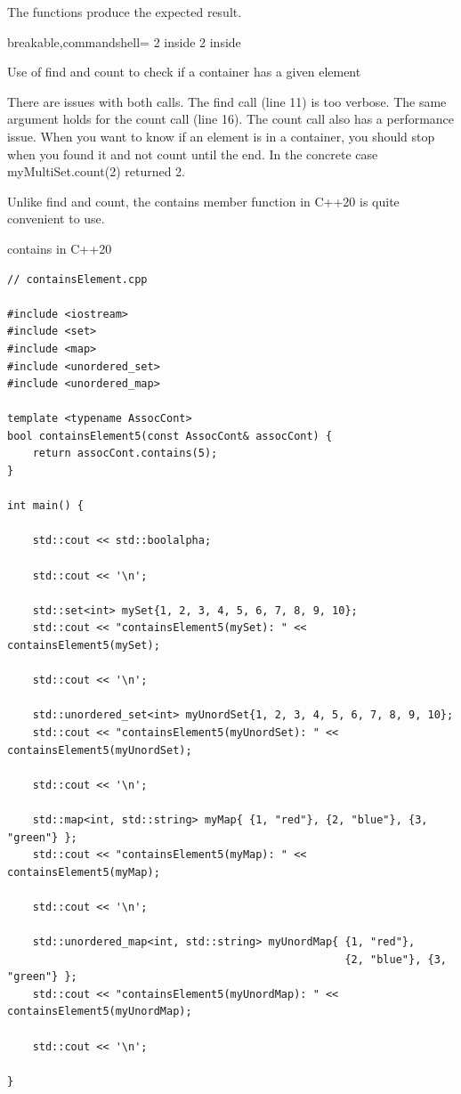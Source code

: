The functions produce the expected result.

\begin{tcblisting}{breakable,commandshell={}}
2 inside
2 inside
\end{tcblisting}

\begin{center}
Use of find and count to check if a container has a given element
\end{center}

There are issues with both calls. The find call (line 11) is too verbose. The same argument holds for the count call (line 16). The count call also has a performance issue. When you want to know if an element is in a container, you should stop when you found it and not count until the end. In the concrete case myMultiSet.count(2) returned 2.

Unlike find and count, the contains member function in C++20 is quite convenient to use.

\noindent
contains in C++20
\begin{lstlisting}[style=styleCXX]
// containsElement.cpp

#include <iostream>
#include <set>
#include <map>
#include <unordered_set>
#include <unordered_map>

template <typename AssocCont>
bool containsElement5(const AssocCont& assocCont) {
	return assocCont.contains(5);
}

int main() {

	std::cout << std::boolalpha;
	
	std::cout << '\n';
	
	std::set<int> mySet{1, 2, 3, 4, 5, 6, 7, 8, 9, 10};
	std::cout << "containsElement5(mySet): " << containsElement5(mySet);
	
	std::cout << '\n';
	
	std::unordered_set<int> myUnordSet{1, 2, 3, 4, 5, 6, 7, 8, 9, 10};
	std::cout << "containsElement5(myUnordSet): " << containsElement5(myUnordSet);
	
	std::cout << '\n';
	
	std::map<int, std::string> myMap{ {1, "red"}, {2, "blue"}, {3, "green"} };
	std::cout << "containsElement5(myMap): " << containsElement5(myMap);
	
	std::cout << '\n';
	
	std::unordered_map<int, std::string> myUnordMap{ {1, "red"},
	                                                 {2, "blue"}, {3, "green"} };
	std::cout << "containsElement5(myUnordMap): " << containsElement5(myUnordMap);
	
	std::cout << '\n';

}
\end{lstlisting}

